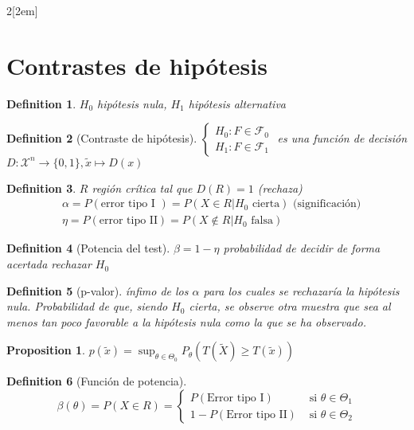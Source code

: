 \documentclass[leqno]{article}
\newtheorem*{proposition}{Proposition}
\newtheorem*{definition}{Definition}
\begin{document}
\begin{multicols}{2}[\columnsep2em]
\section{Contrastes de hipótesis}
\begin{definition} $H_0$ hipótesis nula, $H_1$ hipótesis alternativa
\end{definition}

\begin{definition}[Contraste de hipótesis] $\begin{cases}
  H_0: F \in \mathcal{F}_0\\
  H_1: F \in \mathcal{F}_1
\end{cases}$ 
es una función de decisión $D:\mathcal{X}^n \to \{0,1\}, \tilde{x} \mapsto D(x)$
\end{definition}

\begin{definition} $R$ región crítica tal que  $D(R)=1$ (rechaza)
\begin{align*}
  & \alpha = P(\text{error tipo I }) = P(X\in R|H_0 \text{ cierta}) \text{ (significación)}\\
  & \eta = P(\text{error tipo II}) = P(X \not\in  R|H_0 \text{ falsa})
\end{align*}
\end{definition}

\begin{definition}[Potencia del test] $\beta = 1-\eta$ probabilidad de decidir de forma acertada rechazar $H_0$
\end{definition}

\begin{definition}[p-valor] ínfimo de los $\alpha $ para los cuales se rechazaría la hipótesis nula.
  Probabilidad de que, siendo $H_0$ cierta, se observe otra muestra que sea al menos tan poco favorable a la hipótesis nula como la que se ha observado.
\end{definition}

\begin{proposition}$p(\tilde{x}) = \sup_{\theta \in \Theta_0} P_\theta(T(\tilde{X})\ge T(\tilde{x}))$ 
\end{proposition}

\begin{definition}[Función de potencia]
\[
\beta (\theta ) = P(X\in R) = \begin{cases}
  P(\text{Error tipo I}) & \text{ si } \theta \in \Theta_1 \\
  1-P(\text{Error tipo II}) & \text{ si } \theta \in \Theta_2 
\end{cases}
\] 
\end{definition}


\end{multicols}
\end{document}
